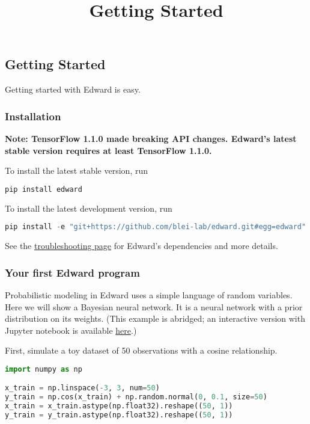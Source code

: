 \title{Getting Started}

\subsection{Getting Started}
Getting started with Edward is easy.

\subsubsection{Installation}

\textbf{Note:
TensorFlow 1.1.0 made breaking API changes.
Edward's latest stable version requires at least TensorFlow 1.1.0.
}

To install the latest stable version, run

\begin{lstlisting}[language=Java]
pip install edward
\end{lstlisting}

To install the latest development version, run

\begin{lstlisting}[language=Java]
pip install -e "git+https://github.com/blei-lab/edward.git#egg=edward"
\end{lstlisting}

See the \href{/troubleshooting}{troubleshooting page} for
Edward's dependencies and more details.


\subsubsection{Your first Edward program}

Probabilistic modeling in Edward uses a simple language of
random variables.
Here we will show a Bayesian neural network. It is a neural network
with a prior distribution on its weights.
(This example is abridged; an interactive version with Jupyter notebook is available
\href{http://nbviewer.jupyter.org/github/blei-lab/edward/blob/master/notebooks/getting_started.ipynb}{here}.)

First, simulate a toy dataset of 50 observations with a cosine relationship.

\begin{lstlisting}[language=Python]
import numpy as np

x_train = np.linspace(-3, 3, num=50)
y_train = np.cos(x_train) + np.random.normal(0, 0.1, size=50)
x_train = x_train.astype(np.float32).reshape((50, 1))
y_train = y_train.astype(np.float32).reshape((50, 1))
\end{lstlisting}

